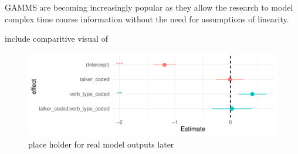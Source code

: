 


GAMMS are becoming increasingly popular as they allow the research to model complex time course information without the need for assumptions of linearity.

include comparitive visual of 
\begin{figure}[h]
    \centering
    \includegraphics[width=\textwidth]{figures/model_gamm_effects.pdf}
    \caption{place holder for real model outputs later}
    \label{fig:model_outputs}
\end{figure}
